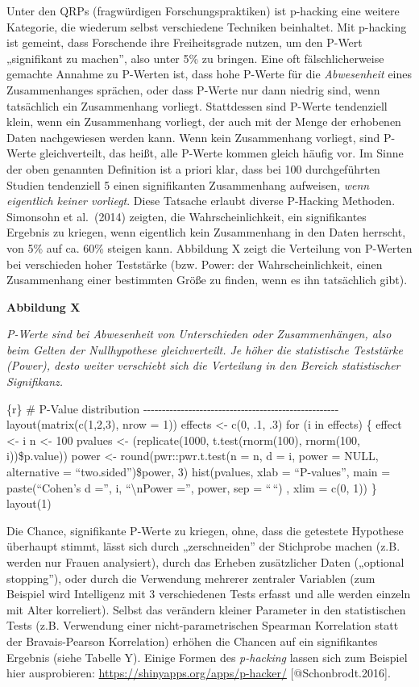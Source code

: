 \documentclass[
  letterpaper,
  DIV=11,
  numbers=noendperiod]{scrreprt}
\begin{document}
Unter den QRPs (fragwürdigen Forschungspraktiken) ist p-hacking eine
weitere Kategorie, die wiederum selbst verschiedene Techniken
beinhaltet. Mit p-hacking ist gemeint, dass Forschende ihre
Freiheitsgrade nutzen, um den P-Wert „signifikant zu machen'', also
unter 5\% zu bringen. Eine oft fälschlicherweise gemachte Annahme zu
P-Werten ist, dass hohe P-Werte für die \emph{Abwesenheit} eines
Zusammenhanges sprächen, oder dass P-Werte nur dann niedrig sind, wenn
tatsächlich ein Zusammenhang vorliegt. Stattdessen sind P-Werte
tendenziell klein, wenn ein Zusammenhang vorliegt, der auch mit der
Menge der erhobenen Daten nachgewiesen werden kann. Wenn kein
Zusammenhang vorliegt, sind P-Werte gleichverteilt, das heißt, alle
P-Werte kommen gleich häufig vor. Im Sinne der oben genannten Definition
ist a priori klar, dass bei 100 durchgeführten Studien tendenziell 5
einen signifikanten Zusammenhang aufweisen, \emph{wenn eigentlich keiner
vorliegt}. Diese Tatsache erlaubt diverse P-Hacking Methoden. Simonsohn
et al.~(2014) zeigten, die Wahrscheinlichkeit, ein signifikantes
Ergebnis zu kriegen, wenn eigentlich kein Zusammenhang in den Daten
herrscht, von 5\% auf ca. 60\% steigen kann. Abbildung X zeigt die
Verteilung von P-Werten bei verschieden hoher Teststärke (bzw. Power:
der Wahrscheinlichkeit, einen Zusammenhang einer bestimmten Größe zu
finden, wenn es ihn tatsächlich gibt).

\textbf{Abbildung X}

\emph{P-Werte sind bei Abwesenheit von Unterschieden oder
Zusammenhängen, also beim Gelten der Nullhypothese gleichverteilt. Je
höher die statistische Teststärke (Power), desto weiter verschiebt sich
die Verteilung in den Bereich statistischer Signifikanz.}

\{r\} \# P-Value distribution
-\/-\/-\/-\/-\/-\/-\/-\/-\/-\/-\/-\/-\/-\/-\/-\/-\/-\/-\/-\/-\/-\/-\/-\/-\/-\/-\/-\/-\/-\/-\/-\/-\/-\/-\/-\/-\/-\/-\/-\/-\/-\/-\/-\/-\/-\/-\/-\/-\/-\/-\/-
layout(matrix(c(1,2,3), nrow = 1)) effects \textless- c(0, .1, .3) for
(i in effects) \{ effect \textless- i n \textless- 100 pvalues
\textless- (replicate(1000, t.test(rnorm(100), rnorm(100, i))\$p.value))
power \textless- round(pwr::pwr.t.test(n = n, d = i, power = NULL,
alternative = ``two.sided'')\$power, 3) hist(pvalues, xlab =
``P-values'', main = paste(``Cohen's d ='', i, ``\textbackslash nPower
='', power, sep = ``\,``) , xlim = c(0, 1)) \} layout(1)

Die Chance, signifikante P-Werte zu kriegen, ohne, dass die getestete
Hypothese überhaupt stimmt, lässt sich durch „zerschneiden'' der
Stichprobe machen (z.B. werden nur Frauen analysiert), durch das Erheben
zusätzlicher Daten („optional stopping''), oder durch die Verwendung
mehrerer zentraler Variablen (zum Beispiel wird Intelligenz mit 3
verschiedenen Tests erfasst und alle werden einzeln mit Alter
korreliert). Selbst das verändern kleiner Parameter in den statistischen
Tests (z.B. Verwendung einer nicht-parametrischen Spearman Korrelation
statt der Bravais-Pearson Korrelation) erhöhen die Chancen auf ein
signifikantes Ergebnis (siehe Tabelle Y). Einige Formen des
\emph{p-hacking} lassen sich zum Beispiel hier ausprobieren:
\url{https://shinyapps.org/apps/p-hacker/} {[}@Schonbrodt.2016{]}.
\end{document}
